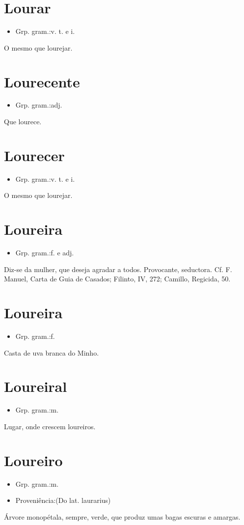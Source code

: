 \section{Lourar}
\begin{itemize}
\item {Grp. gram.:v. t.  e  i.}
\end{itemize}
O mesmo que \textunderscore lourejar\textunderscore .
\section{Lourecente}
\begin{itemize}
\item {Grp. gram.:adj.}
\end{itemize}
Que lourece.
\section{Lourecer}
\begin{itemize}
\item {Grp. gram.:v. t.  e  i.}
\end{itemize}
O mesmo que \textunderscore lourejar\textunderscore .
\section{Loureira}
\begin{itemize}
\item {Grp. gram.:f.  e  adj.}
\end{itemize}
Diz-se da mulher, que deseja agradar a todos.
Provocante, seductora. Cf. F. Manuel, \textunderscore Carta de Guia de Casados\textunderscore ; Filinto, IV, 272; Camillo, \textunderscore Regicida\textunderscore , 50.
\section{Loureira}
\begin{itemize}
\item {Grp. gram.:f.}
\end{itemize}
Casta de uva branca do Minho.
\section{Loureiral}
\begin{itemize}
\item {Grp. gram.:m.}
\end{itemize}
Lugar, onde crescem loureiros.
\section{Loureiro}
\begin{itemize}
\item {Grp. gram.:m.}
\end{itemize}
\begin{itemize}
\item {Proveniência:(Do lat. \textunderscore laurarius\textunderscore )}
\end{itemize}
Árvore monopétala, sempre, verde, que produz umas bagas escuras e amargas.
